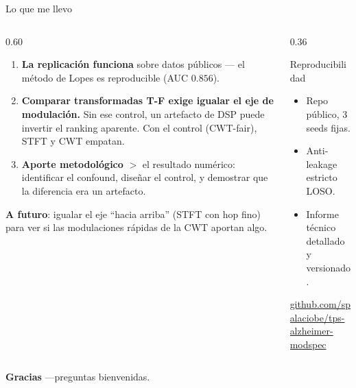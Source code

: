 \documentclass[aspectratio=169, 11pt]{beamer}
\begin{document}
\begin{frame}{Lo que me llevo}

\begin{columns}[T]
\begin{column}{0.60\textwidth}
\begin{enumerate}
    \item \textbf{La replicación funciona} sobre datos públicos ---
    el método de Lopes es reproducible (AUC $0.856$).
    \item \textbf{Comparar transformadas T-F exige igualar el eje de
    modulación.} Sin ese control, un artefacto de DSP puede invertir el
    ranking aparente. Con el control (CWT-fair), STFT y CWT empatan.
    \item \textbf{Aporte metodológico} $>$ el resultado numérico:
    identificar el confound, diseñar el control, y demostrar que la
    diferencia era un artefacto.
\end{enumerate}

\vfill
\small\textbf{A futuro}: igualar el eje ``hacia arriba'' (STFT con hop
fino) para ver si las modulaciones rápidas de la CWT aportan algo.
\end{column}
\begin{column}{0.36\textwidth}
\begin{block}{Reproducibilidad}
\small
\begin{itemize}
    \item Repo público, 3 seeds fijas.
    \item Anti-leakage estricto LOSO.
    \item Informe técnico detallado y versionado.
\end{itemize}
\end{block}
\centering
{\scriptsize\url{github.com/spalaciobe/tps-alzheimer-modspec}}
\end{column}
\end{columns}

\vfill
\centering
{\Large\bfseries Gracias} \quad ---\quad \normalsize preguntas
bienvenidas.

\end{frame}
\end{document}
